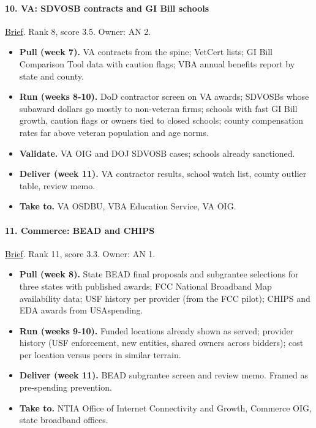 \documentclass[letterpaper,11pt]{article}
\providecommand{\tightlist}{\setlength{\itemsep}{0pt}\setlength{\parskip}{0pt}}
\begin{document}
\hypertarget{va-sdvosb-contracts-and-gi-bill-schools}{%
\paragraph{10. VA: SDVOSB contracts and GI Bill
schools}\label{va-sdvosb-contracts-and-gi-bill-schools}}

\href{agencies/va.pdf}{Brief}. Rank 8, score 3.5. Owner: AN 2.

\begin{itemize}
\tightlist
\item
  \textbf{Pull (week 7).} VA contracts from the spine; VetCert lists; GI
  Bill Comparison Tool data with caution flags; VBA annual benefits
  report by state and county.
\item
  \textbf{Run (weeks 8-10).} DoD contractor screen on VA awards; SDVOSBs
  whose subaward dollars go mostly to non-veteran firms; schools with
  fast GI Bill growth, caution flags or owners tied to closed schools;
  county compensation rates far above veteran population and age norms.
\item
  \textbf{Validate.} VA OIG and DOJ SDVOSB cases; schools already
  sanctioned.
\item
  \textbf{Deliver (week 11).} VA contractor results, school watch list,
  county outlier table, review memo.
\item
  \textbf{Take to.} VA OSDBU, VBA Education Service, VA OIG.
\end{itemize}

\hypertarget{commerce-bead-and-chips}{%
\paragraph{11. Commerce: BEAD and CHIPS}\label{commerce-bead-and-chips}}

\href{agencies/doc.pdf}{Brief}. Rank 11, score 3.3. Owner: AN 1.

\begin{itemize}
\tightlist
\item
  \textbf{Pull (week 8).} State BEAD final proposals and subgrantee
  selections for three states with published awards; FCC National
  Broadband Map availability data; USF history per provider (from the
  FCC pilot); CHIPS and EDA awards from USAspending.
\item
  \textbf{Run (weeks 9-10).} Funded locations already shown as served;
  provider history (USF enforcement, new entities, shared owners across
  bidders); cost per location versus peers in similar terrain.
\item
  \textbf{Deliver (week 11).} BEAD subgrantee screen and review memo.
  Framed as pre-spending prevention.
\item
  \textbf{Take to.} NTIA Office of Internet Connectivity and Growth,
  Commerce OIG, state broadband offices.
\end{itemize}
\end{document}
